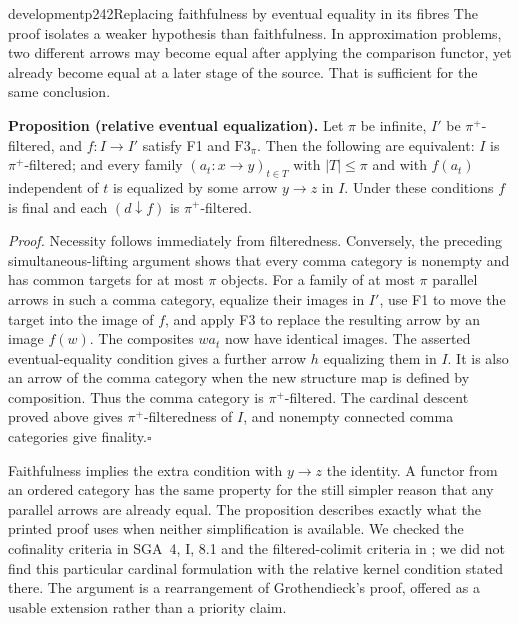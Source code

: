 \begin{dcomment}{development}{p242}{Replacing faithfulness by eventual equality in its fibres}
The proof isolates a weaker hypothesis than faithfulness.  In approximation problems, two different arrows may become equal after applying the comparison functor, yet already become equal at a later stage of the source.  That is sufficient for the same conclusion.

\textbf{Proposition (relative eventual equalization).}\ours
Let $\pi$ be infinite, $I'$ be $\pi^+$-filtered, and $f:I\to I'$ satisfy F1 and $\mathrm{F3}_\pi$.  Then the following are equivalent: $I$ is $\pi^+$-filtered; and every family $(a_t:x\to y)_{t\in T}$ with $|T|\leq\pi$ and with $f(a_t)$ independent of $t$ is equalized by some arrow $y\to z$ in $I$.  Under these conditions $f$ is final and each $(d\downarrow f)$ is $\pi^+$-filtered.

\textit{Proof.} Necessity follows immediately from filteredness.  Conversely, the preceding simultaneous-lifting argument shows that every comma category is nonempty and has common targets for at most $\pi$ objects.  For a family of at most $\pi$ parallel arrows in such a comma category, equalize their images in $I'$, use F1 to move the target into the image of $f$, and apply F3 to replace the resulting arrow by an image $f(w)$.  The composites $wa_t$ now have identical images.  The asserted eventual-equality condition gives a further arrow $h$ equalizing them in $I$.  It is also an arrow of the comma category when the new structure map is defined by composition.  Thus the comma category is $\pi^+$-filtered.  The cardinal descent proved above gives $\pi^+$-filteredness of $I$, and nonempty connected comma categories give finality.\hfill$\square$

Faithfulness implies the extra condition with $y\to z$ the identity.  A functor from an ordered category has the same property for the still simpler reason that any parallel arrows are already equal.  The proposition describes exactly what the printed proof uses when neither simplification is available.  We checked the cofinality criteria in SGA~4, I, 8.1 and the filtered-colimit criteria in \citet[Section 4.19]{StacksFiltered}; we did not find this particular cardinal formulation with the relative kernel condition stated there.  The argument is a rearrangement of Grothendieck's proof, offered as a usable extension rather than a priority claim.
\end{dcomment}

